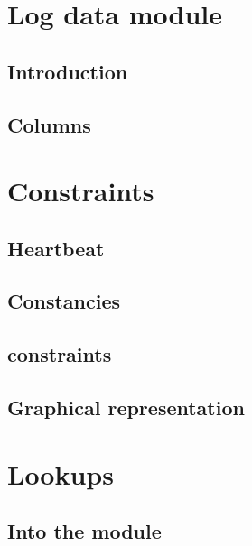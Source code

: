 \section{Log data module}                            \label{log data: generalities}
\subsection{Introduction}                            \label{log data: generalities: intro}                 
\subsection{Columns}                                 \label{log data: generalities: columns}               

\section{Constraints}                                \label{log data: constraints}
\subsection{Heartbeat}                               \label{log data: constraints: heartbeat}              
\subsection{Constancies}                             \label{log data: constraints: constancies}            
\subsection{\logLogsData{} constraints}              \label{log data: constraints: log logs data}          
\subsection{Graphical representation}                \label{log data: constraints: graphical rep data}     

\section{Lookups}                                    \label{log data: lookups}
\subsection{Into the \rlpTxnRcptMod{} module}            \label{log data: lookups: into txn rlp}               
